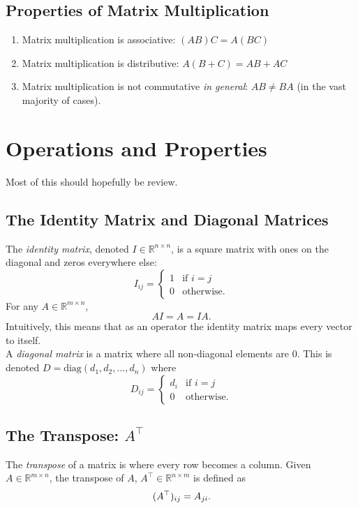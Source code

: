 \documentclass{article}
\newcommand{\1}{\mathbf{1}}
\newcommand{\0}{\mathbf{0}}
\newcommand{\RR}{\mathbb{R}}
\newcommand{\T}{\top}
\begin{document}
\subsection{Properties of Matrix Multiplication}

\begin{enumerate}[-]
    \item Matrix multiplication is associative: $(AB)C = A(BC)$
    \item Matrix multiplication is distributive: $A(B+C) = AB + AC$
    \item Matrix multiplication is not commutative \textit{in general}:
        $AB \neq BA$ (in the vast majority of cases).
\end{enumerate}

\section{Operations and Properties}

Most of this should hopefully be review.

\subsection{The Identity Matrix and Diagonal Matrices}

The \textit{identity matrix}, denoted $I\in\RR^{n\times n}$, is a square matrix
with ones on the diagonal and zeros everywhere else:
\[
    I_{ij} = \begin{cases} 1 & \text{if $i=j$}\\
        0 & \text{otherwise.}
    \end{cases}
\]
For any $A\in\RR^{m\times n}$,
\[
    AI = A = IA.
\]
Intuitively, this means that as an operator the identity matrix maps every
vector to itself.\\

A \textit{diagonal matrix} is a matrix where all non-diagonal elements are 0.
This is denoted $D=\mathrm{diag}(d_1,d_2,\dots,d_n)$ where
\[
    D_{ij} = \begin{cases}
        d_i & \text{if $i=j$}\\
        0 & \text{otherwise.}
    \end{cases}
\]

\subsection{The Transpose: $A^\T$}

The \textit{transpose} of a matrix is where every row becomes a column. Given
$A\in\RR^{m\times n}$, the transpose of $A$, $A^\T\in\RR^{n\times m}$ is defined
as
\[
    (A^\T)_{ij} = A_{ji}.\\
\]
\end{document}
